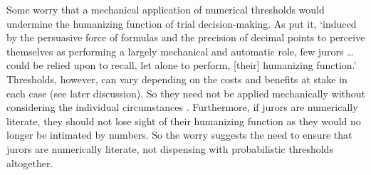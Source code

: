 \documentclass{article}
\begin{document}
Some worry that a mechanical application of numerical thresholds would undermine the humanizing function of trial decision-making. %
As \cite{tribe71} put it, `induced by the persuasive force of formulas and the precision of  decimal  points  to  perceive  themselves  as  performing  a  largely mechanical and automatic  role, few jurors \dots could be relied upon to recall, let alone to perform, [their] humanizing function.' 
Thresholds, however, can vary depending on the costs and benefits at stake in each case (see later discussion). So they need not be applied mechanically without considering the individual circumstances  \citep{HeddenColyvan2019legal}. Furthermore, if jurors are numerically literate, they should not lose sight of their humanizing function as they would no longer be intimated by numbers. So the worry suggests the need to ensure that jurors are numerically literate, not dispensing with probabilistic thresholds altogether. 
\end{document}
